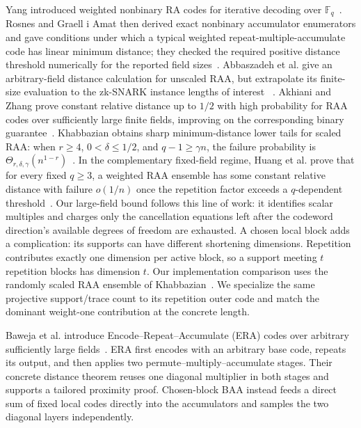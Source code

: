 \documentclass[runningheads,envcountsame,envcountsect]{llncs}
\newcommand{\F}{\mathbb F}
\begin{document}
Yang introduced weighted nonbinary RA codes for iterative decoding over
$\F_q$~\cite{yang04}.  Rosnes and Graell i Amat then derived exact
nonbinary accumulator enumerators and gave conditions under which a typical
weighted repeat-multiple-accumulate code has linear minimum distance; they
checked the required positive distance threshold numerically for the reported
field sizes~\cite{rosnes11}.  Abbaszadeh et al. give an
arbitrary-field distance calculation for unscaled RAA, but extrapolate its
finite-size evaluation to the zk-SNARK instance lengths of interest
~\cite{outsourcing26}.  Akhiani and Zhang prove constant relative distance up
to $1/2$ with high probability for RAA codes over sufficiently large finite
fields, improving on the corresponding binary guarantee~\cite{akhiani26}.
Khabbazian obtains sharp minimum-distance lower tails for scaled RAA: when
$r\geq 4$, $0<\delta\leq 1/2$, and $q-1\geq \gamma n$, the failure
probability is $\Theta_{r,\delta,\gamma}(n^{1-r})$~\cite{khabbazian26}.
In the complementary fixed-field regime, Huang et al. prove that for every
fixed $q\geq 3$, a weighted RAA ensemble has some constant relative distance
with failure $o(1/n)$ once the repetition factor exceeds a $q$-dependent
 threshold~\cite{blindraa26}.  Our large-field bound follows this line of work:
 it identifies scalar multiples and charges only the cancellation equations left
 after the codeword direction's available degrees of freedom are exhausted.
 A chosen local block adds a complication: its supports can have different
 shortening dimensions.  Repetition contributes exactly one dimension per
 active block, so a support meeting $t$ repetition blocks has dimension $t$.
 Our implementation comparison uses the randomly scaled RAA ensemble of
 Khabbazian~\cite{khabbazian26}.  We specialize the same projective
 support/trace count to its repetition outer code and match the dominant
 weight-one contribution at the concrete length.

Baweja et al. introduce Encode--Repeat--Accumulate (ERA) codes over arbitrary
sufficiently large fields~\cite{era26}.  ERA first encodes with an arbitrary
base code, repeats its output, and then applies two permute--multiply--accumulate
stages.  Their concrete distance theorem reuses one diagonal multiplier in both
stages and supports a tailored proximity proof.  Chosen-block BAA instead feeds
a direct sum of fixed local codes directly into the accumulators and samples
the two diagonal layers independently.
\end{document}
